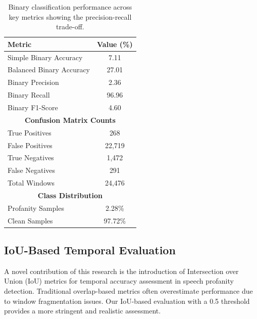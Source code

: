 \documentclass[11pt]{article}
\begin{document}
\begin{table}[H]
    \caption{Binary classification performance across key metrics showing the precision-recall trade-off.}
    \centering
    \label{tab:binary-performance}
    \begin{tabular}{|l|c|}
        \hline
        \textbf{Metric} & \textbf{Value (\%)} \\
        \hline
        Simple Binary Accuracy & 7.11 \\
        Balanced Binary Accuracy & 27.01 \\
        Binary Precision & 2.36 \\
        Binary Recall & 96.96 \\
        Binary F1-Score & 4.60 \\
        \hline
        \multicolumn{2}{|c|}{\textbf{Confusion Matrix Counts}} \\
        \hline
        True Positives & 268 \\
        False Positives & 22,719 \\
        True Negatives & 1,472 \\
        False Negatives & 291 \\
        Total Windows & 24,476 \\
        \hline
        \multicolumn{2}{|c|}{\textbf{Class Distribution}} \\
        \hline
        Profanity Samples & 2.28\% \\
        Clean Samples & 97.72\% \\
        \hline
    \end{tabular}
\end{table}

\subsection{IoU-Based Temporal Evaluation}
A novel contribution of this research is the introduction of Intersection over Union (IoU) metrics for temporal accuracy assessment in speech profanity detection. Traditional overlap-based metrics often overestimate performance due to window fragmentation issues. Our IoU-based evaluation with a 0.5 threshold provides a more stringent and realistic assessment.
\end{document}
